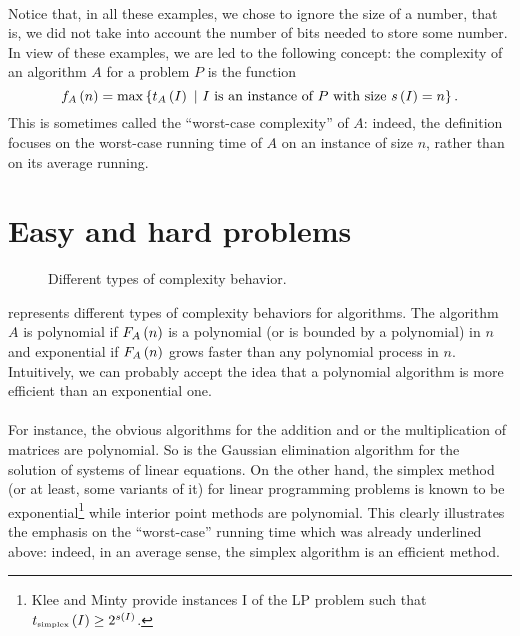 \documentclass[titlepage]{book}
\theoremstyle{plain}
\theoremstyle{definition}
\theoremstyle{remark}
\begin{document}
\paragraph{}
Notice that, in all these examples, we chose to ignore the size of a number, that is, we did not take into account the number of bits needed to store some number. In view of these examples, we are led to the following concept: the complexity of an algorithm $A$ for a problem $P$ is the function 
\begin{equation}
f_A\left( n \right)=\max\left\{ t_A\left( I \right)\ |\ \mbox{$I$ is an instance of $P$ with size $s\left( I \right)=n$} \right\}.
\end{equation}
This is sometimes called the ``worst-case complexity'' of $A$: indeed, the definition focuses on the worst-case running time of $A$ on an instance of size $n$, rather than on its average running.

\section{Easy and hard problems}

\begin{figure}[hbt]
\centering
{}
\caption{Different types of complexity behavior.}
\end{figure}

 represents different types of complexity behaviors for algorithms. The algorithm $A$ is polynomial if $F_A\left( n \right)$ is a polynomial (or is bounded by a polynomial) in $n$ and exponential if $F_A\left( n \right)$ grows faster than any polynomial process in $n$. Intuitively, we can probably accept the idea that a polynomial algorithm is more efficient than an exponential one.

\paragraph{}
For instance, the obvious algorithms for the addition and or the multiplication of matrices are polynomial. So is the Gaussian elimination algorithm for the solution of systems of linear equations. On the other hand, the simplex method (or at least, some variants of it) for linear programming problems is known to be exponential\footnote{Klee and Minty provide instances I of the LP problem such that $t_{\mbox{\tiny simplex}}\left( I \right)\geq 2^{s\left( I \right)}$.} while interior point methods are polynomial. This clearly illustrates the emphasis on the ``worst-case'' running time which was already underlined above: indeed, in an average sense, the simplex algorithm is an efficient method.
\end{document}

